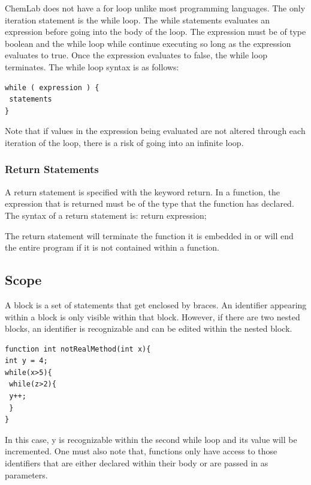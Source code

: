 \documentclass[11pt]{report}
\begin{document}
ChemLab does not have a for loop unlike most programming languages. The only iteration statement is the while loop. The while statements evaluates an expression before going into the body of the loop. The expression must be of type boolean and the while loop while continue executing so long as the expression evaluates to true. Once the expression evaluates to false, the while loop terminates. The while loop syntax is as follows:
\begin{verbatim}
while ( expression ) {
 statements 
}
\end{verbatim}
Note that if values in the expression being evaluated are not altered through each iteration of the loop, there is a risk of going into an infinite loop. 

\subsubsection{Return Statements}

A return statement is specified with the keyword return. In a function, the expression that is returned must be of the type that the function has declared. The syntax of a return statement is:
 return expression;

The return statement will terminate the function it is embedded in or will end the entire program if it is not contained within a function. 

\subsection{Scope}

A block is a set of statements that get enclosed by braces. An identifier appearing within a block is only visible within that block. However, if there are two nested blocks, an identifier is recognizable and can be edited within the nested block. 
\begin{verbatim}
function int notRealMethod(int x){
int y = 4;
while(x>5){
 while(z>2){
 y++;
 }
}
\end{verbatim}
In this case, y is recognizable within the second while loop and its value will be incremented. One must also note that, functions only have access to those identifiers that are either declared within their body or are passed in as parameters.
\end{document}
